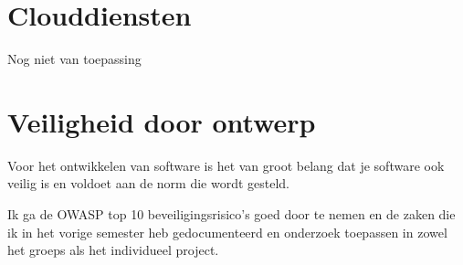 \section{Clouddiensten}\label{sec:clouddiensten}

Nog niet van toepassing








\newpage
\section{Veiligheid door ontwerp}\label{sec:veiligheid-door-ontwerp}

Voor het ontwikkelen van software is het van groot belang dat je software ook veilig is en voldoet aan de norm die
wordt gesteld.

Ik ga de OWASP top 10 beveiligingsrisico's goed door te nemen en de zaken die ik in het vorige semester heb
gedocumenteerd en onderzoek toepassen in zowel het groeps als het individueel project.

